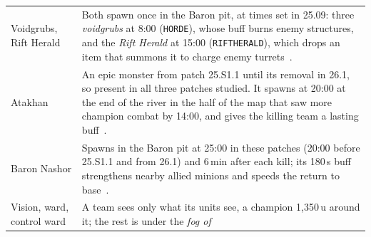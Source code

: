 \begin{table}[!t]
\begin{tabularx}{\textwidth}{@{}>{\raggedright\arraybackslash}p{2.35cm}X@{}}
Voidgrubs, Rift Herald &
  Both spawn once in the Baron pit, at times set in 25.09: three \emph{voidgrubs} at 8:00
  (\texttt{HORDE}), whose buff burns enemy structures, and the \emph{Rift Herald} at 15:00
  (\texttt{RIFTHERALD}), which drops an item that summons it to charge enemy
  turrets~\cite{lolwiki2026voidgrub,lolwiki2026riftherald,lolwiki2026v2509}. \\
Atakhan &
  An epic monster from patch 25.S1.1 until its removal in 26.1, so present in all three patches studied.
  It spawns at 20:00 at the end of the river in the half of the map that saw more champion combat by
  14:00, and gives the killing team a lasting buff~\cite{lolwiki2026atakhan,riot2026patch261}. \\
Baron Nashor &
  Spawns in the Baron pit at 25:00 in these patches (20:00 before 25.S1.1 and from 26.1) and 6\,min after
  each kill; its 180\,s buff strengthens nearby allied minions and speeds the return to
  base~\cite{lolwiki2026baron}. \\
\midrule
Vision, ward, control ward &
  A team sees only what its units see, a champion 1,350\,u around it; the rest is under the \emph{fog of
}
\end{tabularx}
\end{table}
